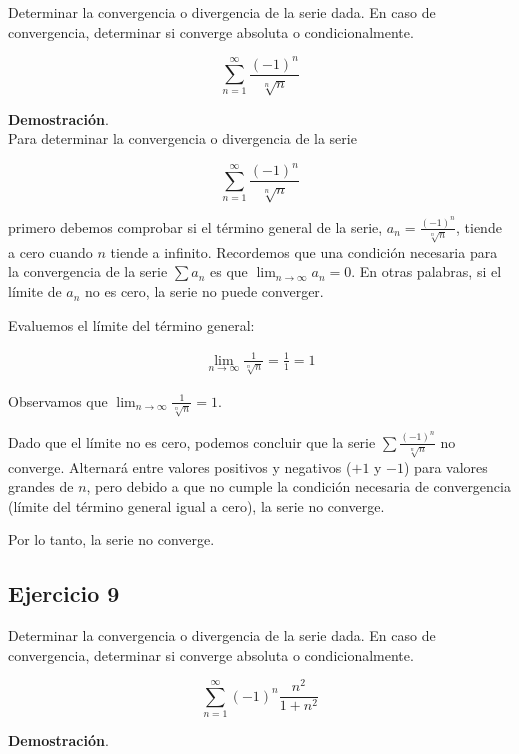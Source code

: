 \documentclass{article}
\begin{document}
    Determinar la convergencia o divergencia de la serie dada. En caso de convergencia, determinar si converge absoluta o condicionalmente.

    $$
    \sum_{n=1}^{\infty} \frac{(-1)^{n}}{\sqrt[n]{n}}
    $$

    \textbf{Demostración}.\\

    Para determinar la convergencia o divergencia de la serie

    $$
    \sum_{n=1}^{\infty} \frac{(-1)^{n}}{\sqrt[n]{n}}
    $$

    primero debemos comprobar si el término general de la serie, \( a_n = \frac{(-1)^{n}}{\sqrt[n]{n}} \), tiende a cero cuando \( n \) tiende a infinito. Recordemos que una condición necesaria para la convergencia de la serie \( \sum a_n \) es que \( \lim_{n \rightarrow \infty} a_n = 0 \). En otras palabras, si el límite de \( a_n \) no es cero, la serie no puede converger.

    Evaluemos el límite del término general:

    \begin{align*}
    \lim_{n \rightarrow \infty} \frac{1}{\sqrt[n]{n}} = \frac{1}{1} = 1
    \end{align*}

    Observamos que \( \lim_{n \rightarrow \infty} \frac{1}{\sqrt[n]{n}} = 1 \).

    Dado que el límite no es cero, podemos concluir que la serie \( \sum \frac{(-1)^{n}}{\sqrt[n]{n}} \) no converge. Alternará entre valores positivos y negativos (\(+1\) y \(-1\)) para valores grandes de \( n \), pero debido a que no cumple la condición necesaria de convergencia (límite del término general igual a cero), la serie no converge.

    Por lo tanto, la serie no converge.



    \subsection*{Ejercicio 9}

    Determinar la convergencia o divergencia de la serie dada. En caso de convergencia, determinar si converge absoluta o condicionalmente.

    $$
    \sum_{n=1}^{\infty}(-1)^{n} \frac{n^{2}}{1+n^{2}}
    $$

    \textbf{Demostración}.\\
\end{document}

